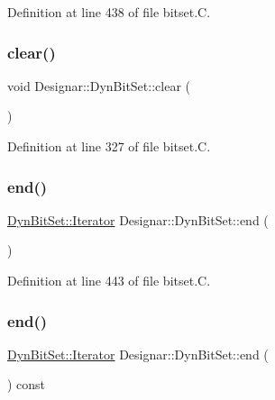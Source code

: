 Definition at line 438 of file bitset.\+C.

\mbox{\label{class_designar_1_1_dyn_bit_set_af73666f08fda747f5d2dd9c1343f884f}} 
\subsubsection{\texorpdfstring{clear()}{clear()}}
{\footnotesize\ttfamily void Designar\+::\+Dyn\+Bit\+Set\+::clear (\begin{DoxyParamCaption}{ }\end{DoxyParamCaption})}



Definition at line 327 of file bitset.\+C.

\mbox{\label{class_designar_1_1_dyn_bit_set_a2d7725ebf960363167ccabaacd37bec6}} 
\subsubsection{\texorpdfstring{end()}{end()}\hspace{0.1cm}{\footnotesize\ttfamily [1/2]}}
{\footnotesize\ttfamily \hyperlink{class_designar_1_1_dyn_bit_set_1_1_iterator}{Dyn\+Bit\+Set\+::\+Iterator} Designar\+::\+Dyn\+Bit\+Set\+::end (\begin{DoxyParamCaption}{ }\end{DoxyParamCaption})}



Definition at line 443 of file bitset.\+C.

\mbox{\label{class_designar_1_1_dyn_bit_set_a1ca3f63ddb290be233b1311d1b4439b2}} 
\subsubsection{\texorpdfstring{end()}{end()}\hspace{0.1cm}{\footnotesize\ttfamily [2/2]}}
{\footnotesize\ttfamily \hyperlink{class_designar_1_1_dyn_bit_set_1_1_iterator}{Dyn\+Bit\+Set\+::\+Iterator} Designar\+::\+Dyn\+Bit\+Set\+::end (\begin{DoxyParamCaption}{ }\end{DoxyParamCaption}) const}



